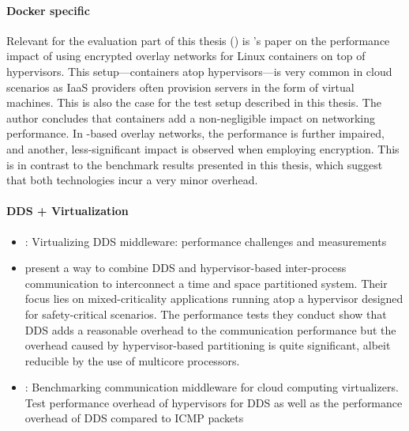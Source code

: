 \paragraph{Docker specific}
Relevant for the evaluation part of this thesis () is \citeauthor*{kratzke2017microservices}'s paper \cite{kratzke2017microservices} on the performance impact of using encrypted overlay networks for Linux containers on top of hypervisors. This setup---containers atop hypervisors---is very common in cloud scenarios as IaaS providers often provision servers in the form of virtual machines. This is also the case for the test setup described in this thesis. The author concludes that containers add a non-negligible impact on networking performance. In \wnet -based overlay networks, the performance is further impaired, and another, less-significant impact is observed when employing encryption. This is in contrast to the benchmark results presented in this thesis, which suggest that both technologies incur a very minor overhead.




\paragraph{DDS + Virtualization}
\begin{itemize}
	\item \cite{serrano2013virtualizing}: Virtualizing DDS middleware: performance challenges and measurements
	\item \citeauthor*{perez:gutierrez:ieeetpds16} \cite{perez:gutierrez:ieeetpds16} present a way to combine DDS and hypervisor-based inter-process communication to interconnect a time and space partitioned system. Their focus lies on mixed-criticality applications running atop a hypervisor designed for safety-critical scenarios. The performance tests they conduct show that DDS adds a reasonable overhead to the communication performance but the overhead caused by hypervisor-based partitioning is quite significant, albeit reducible by the use of multicore processors.
	\item \cite{garcia2013benchmarking}: Benchmarking communication middleware for cloud computing virtualizers. Test performance overhead of hypervisors for DDS as well as the performance overhead of DDS compared to ICMP packets
\end{itemize}


